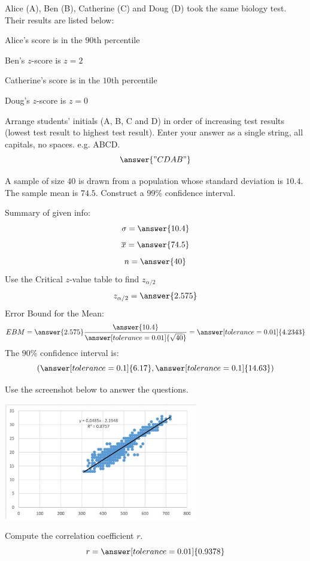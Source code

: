 \documentclass{ximera}
\begin{document}
\begin{problem}\label{prob:140finalprob3}
Alice (A), Ben (B), Catherine (C) and Doug (D) took the same biology test.  Their results are listed below: 

Alice's score is in the $90$th percentile 

Ben's $z$-score is $z = 2$ 

Catherine's score is in the $10$th percentile 

Doug's $z$-score is $z = 0$

Arrange students’ initials (A, B, C and D) in order of increasing test results (lowest test result to highest test result).  Enter your answer as a single string, all capitals, no spaces.  e.g. ABCD.
$$\answer{"CDAB"}$$
\end{problem}

\begin{problem}\label{prob:140finalprob4}
A sample of size $40$ is drawn from a population whose standard deviation is $10.4$.  The sample mean is $74.5$.  Construct a 99\% confidence interval.

Summary of given info:
$$\sigma=\answer{10.4}$$
$$\overline{x}=\answer{74.5}$$
$$n=\answer{40}$$
Use the Critical $z$-value table to find $z_{\alpha/2}$
$$z_{\alpha/2}=\answer{2.575}$$
Error Bound for the Mean:
$$EBM=\answer{2.575}\frac{\answer{10.4}}{\answer[tolerance=0.01]{\sqrt{40}}}=\answer[tolerance=0.01]{4.2343}$$
The 90\% confidence interval is:
$$(\answer[tolerance=0.1]{6.17},\answer[tolerance=0.1]{14.63})$$
\end{problem}

\begin{problem}\label{prob:140finalprob5}
Use the screenshot below to answer the questions.  

\begin{center}
\includegraphics[height=2in]{140finalpic1.jpg}
\end{center}

Compute the correlation coefficient $r$.
 $$r=\answer[tolerance=0.01]{0.9378}$$
\end{problem}
\end{document}
